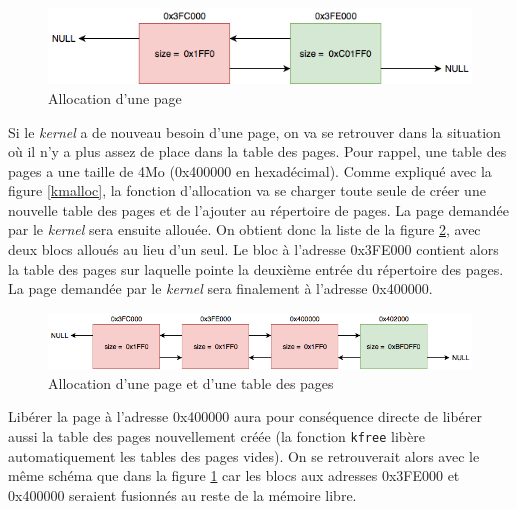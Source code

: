 \begin{figure}[!h]
  \centering
  \includegraphics[scale=0.6]{images/alloc1.png}
  \caption{Allocation d'une page}
  \label{alloc1}
\end{figure}

Si le \textit{kernel} a de nouveau besoin d'une page, on va se retrouver dans la
situation où il n'y a plus assez de place dans la table des pages. Pour rappel,
une table des pages a une taille de 4Mo (0x400000 en hexadécimal). Comme expliqué
avec la figure \ref{kmalloc}, la fonction d'allocation va se charger toute seule
de créer une nouvelle table des pages et de l'ajouter au répertoire de pages.
La page demandée par le \textit{kernel} sera ensuite allouée. On obtient donc
la liste de la figure \ref{alloc2}, avec deux blocs alloués au lieu d'un seul.
Le bloc à l'adresse 0x3FE000 contient alors la table des pages sur laquelle pointe
la deuxième entrée du répertoire des pages. La page demandée par le \textit{kernel}
sera finalement à l'adresse 0x400000.

\begin{figure}[!h]
  \centering
  \includegraphics[scale=0.6]{images/alloc2.png}
  \caption{Allocation d'une page et d'une table des pages}
  \label{alloc2}
\end{figure}

Libérer la page à l'adresse 0x400000 aura pour conséquence directe de libérer aussi
la table des pages nouvellement créée (la fonction \texttt{kfree} libère
automatiquement les tables des pages vides). On se retrouverait alors avec le même
schéma que dans la figure \ref{alloc1} car les blocs aux adresses 0x3FE000 et
0x400000 seraient fusionnés au reste de la mémoire libre.